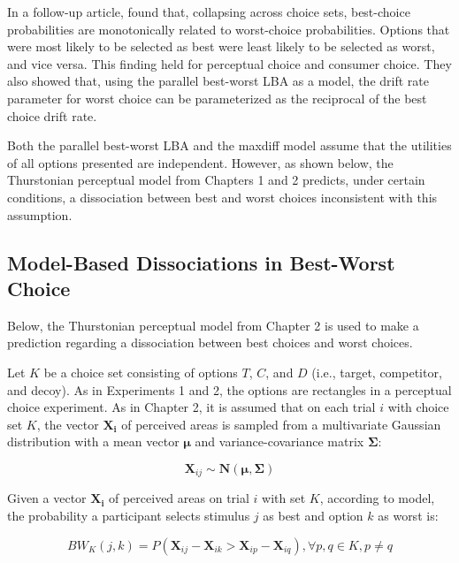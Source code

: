 In a follow-up article, \textcite{hawkinsBestTimesWorst2014} found that, collapsing across choice sets, best-choice probabilities are monotonically related to worst-choice probabilities. Options that were most likely to be selected as best were least likely to be selected as worst, and vice versa. This finding held for perceptual choice and consumer choice. They also showed that, using the parallel best-worst LBA as a model, the drift rate parameter for worst choice can be parameterized as the reciprocal of the best choice drift rate. 

Both the parallel best-worst LBA and the maxdiff model assume that the utilities of all options presented are independent. However, as shown below, the Thurstonian perceptual model from Chapters 1 and 2 predicts, under certain conditions, a dissociation between best and worst choices inconsistent with this assumption.

\subsection{Model-Based Dissociations in Best-Worst Choice}

Below, the Thurstonian perceptual model from Chapter 2 is used to make a prediction regarding a dissociation between best choices and worst choices. 

Let $K$ be a choice set consisting of options $T$, $C$, and $D$ (i.e., target, competitor, and decoy). As in Experiments 1 and 2, the options are rectangles in a perceptual choice experiment. As in Chapter 2, it is assumed that on each trial $i$ with choice set $K$, the vector $\mathbf{X_{i}}$ of perceived areas is sampled from a multivariate Gaussian distribution with a mean vector $\boldsymbol{\mu}$ and variance-covariance matrix $\boldsymbol{\Sigma}$:

\begin{equation}
   \boldsymbol{X}_{ij} \sim \mathcal{\boldsymbol{N}}(\boldsymbol{\mu},\boldsymbol{\Sigma})
   \label{eqn:bw_thurstone_dist}
\end{equation}

Given a vector $\mathbf{X_{i}}$ of perceived areas on trial $i$ with set $K$, according to model, the probability a participant selects stimulus $j$ as best and option $k$ as worst is:

\begin{equation}
   BW_{K}(j,k)=P(\mathbf{X}_{ij}-\mathbf{X}_{ik} > \mathbf{X}_{ip}-\mathbf{X}_{iq}), \forall p, q \in K, p \neq q
   \label{eqn:bw_thurstone_equation}
\end{equation}

